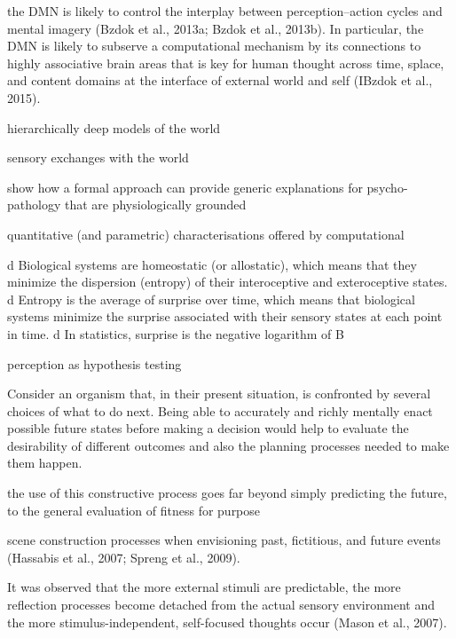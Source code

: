 \documentclass{article} %
\begin{document}
%
the DMN is likely to control the interplay between perception–action cycles and mental imagery (Bzdok et al., 2013a; Bzdok et al., 2013b). In particular, the DMN is likely to subserve a computational mechanism by its connections to highly associative brain areas that is key for human thought across time, splace, and content domains at the interface of external world and self (IBzdok et al., 2015).
%

hierarchically deep models of the world

sensory exchanges with the world

show how a formal approach can provide generic explanations for psycho- pathology that are physiologically grounded

quantitative (and parametric) characterisations offered by computational

d Biological systems are homeostatic (or allostatic), which
means that they minimize the dispersion (entropy) of their
interoceptive and exteroceptive states.
d Entropy is the average of surprise over time, which means
that biological systems minimize the surprise associated
with their sensory states at each point in time.
d In statistics, surprise is the negative logarithm of B

perception as hypothesis testing 

Consider an organism that, in their present situation, is confronted by several choices of what to do next. Being able to accurately and richly mentally enact possible future states before making a decision would help to evaluate the desirability of different outcomes and also the planning processes needed to make them happen.

 the use of this constructive process goes far beyond simply predicting the future, to the general evaluation of fitness for purpose

scene construction processes when envisioning past, fictitious, and future events (Hassabis et al., 2007; Spreng et al., 2009).

It was observed that the more external stimuli are predictable, the more reflection processes become detached from the actual sensory environment and the more stimulus-independent, self-focused thoughts occur (Mason et al., 2007).
\end{document}
